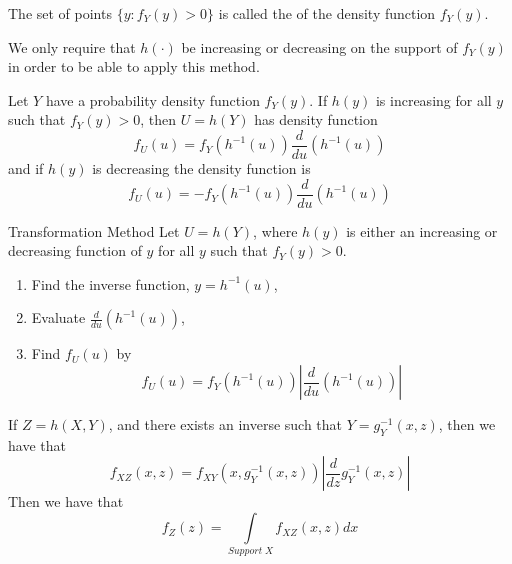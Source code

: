 \documentclass[12pt, a4paper, twoside, openright, titlepage]{book}
\begin{document}
\begin{defn}{}{}
    The set of points $\{y:f_Y(y) > 0\}$ is called the  of the density function $f_Y(y)$.
\end{defn}

We only require that $h(\cdot)$ be increasing or decreasing on the support of $f_Y(y)$ in order to be able to apply this method. 

\begin{thm}{}{}
    Let $Y$ have a probability density function $f_Y(y)$. If $h(y)$ is increasing for all $y$ such that $f_Y(y) > 0$, then $U = h(Y)$ has density function \begin{equation*}
        f_U(u) = f_Y(h^{-1}(u))\frac{d}{du}(h^{-1}(u))
    \end{equation*}
    and if $h(y)$ is decreasing the density function is \begin{equation*}
        f_U(u) = -f_Y(h^{-1}(u))\frac{d}{du}(h^{-1}(u))
    \end{equation*}
\end{thm}

\begin{defn}{Transformation Method}{}
    Let $U = h(Y)$, where $h(y)$ is either an increasing or decreasing function of $y$ for all $y$ such that $f_Y(y) > 0$. \begin{enumerate}
        \item Find the inverse function, $y = h^{-1}(u)$,
        \item Evaluate $\frac{d}{du}(h^{-1}(u))$,
        \item Find $f_U(u)$ by \begin{equation*}
                f_U(u) = f_Y(h^{-1}(u))\left|\frac{d}{du}(h^{-1}(u))\right|
        \end{equation*}
    \end{enumerate}
\end{defn}


\begin{rmk}{}{}
    If $Z = h(X,Y)$, and there exists an inverse such that $Y = g_Y^{-1}(x,z)$, then we have that \begin{equation*}
        f_{XZ}(x,z) = f_{XY}(x, g_Y^{-1}(x,z))\left|\frac{d}{dz}g_Y^{-1}(x,z)\right|
    \end{equation*}
    Then we have that \begin{equation*}
        f_Z(z) = \int\limits_{Support\;X}f_{XZ}(x,z)dx
    \end{equation*}
\end{rmk}
\end{document}
